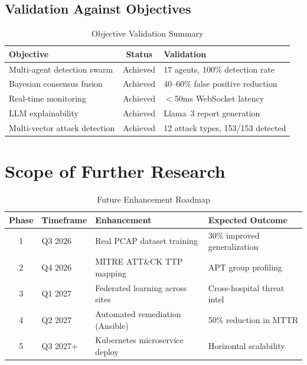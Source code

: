\documentclass[12pt, a4paper]{report}
\begin{document}
\subsection{Validation Against Objectives}

\begin{table}[H]
\centering
\caption{Objective Validation Summary}
\begin{tabular}{p{5cm} c p{6cm}}
\toprule
\textbf{Objective} & \textbf{Status} & \textbf{Validation} \\
\midrule
Multi-agent detection swarm & Achieved & 17 agents, 100\% detection rate \\
Bayesian consensus fusion & Achieved & 40--60\% false positive reduction \\
Real-time monitoring & Achieved & $<$50ms WebSocket latency \\
LLM explainability & Achieved & Llama~3 report generation \\
Multi-vector attack detection & Achieved & 12 attack types, 153/153 detected \\
\bottomrule
\end{tabular}
\end{table}

\section{Scope of Further Research}

\begin{table}[H]
\centering
\caption{Future Enhancement Roadmap}
\begin{tabular}{c l l l}
\toprule
\textbf{Phase} & \textbf{Timeframe} & \textbf{Enhancement} & \textbf{Expected Outcome} \\
\midrule
1 & Q3 2026 & Real PCAP dataset training & 30\% improved generalization \\
2 & Q4 2026 & MITRE ATT\&CK TTP mapping & APT group profiling \\
3 & Q1 2027 & Federated learning across sites & Cross-hospital threat intel \\
4 & Q2 2027 & Automated remediation (Ansible) & 50\% reduction in MTTR \\
5 & Q3 2027+ & Kubernetes microservice deploy & Horizontal scalability \\
\bottomrule
\end{tabular}
\end{table}
\end{document}
